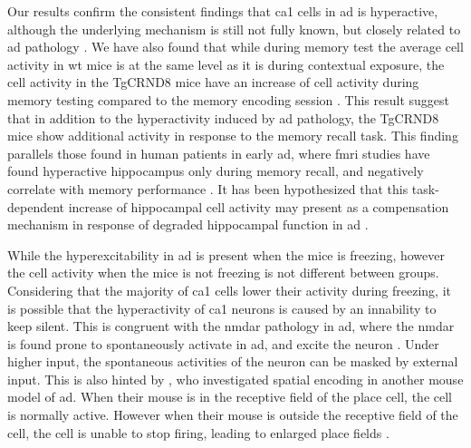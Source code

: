 Our results confirm the consistent findings that \gls{ca1} cells in \gls{ad} is hyperactive, although the underlying mechanism is still not fully known, but closely related to \gls{ad} pathology . We have also found that while during memory test the average cell activity in \gls{wt} mice is at the same level as it is during contextual exposure, the cell activity in the TgCRND8 mice have an increase of cell activity during memory testing compared to the memory encoding session . This result suggest that in addition to the hyperactivity induced by \gls{ad} pathology, the TgCRND8 mice show additional activity in response to the memory recall task. This finding parallels those found in human patients in early \gls{ad}, where \gls{fmri} studies have found hyperactive hippocampus only during memory recall, and negatively correlate with memory performance \citep{sperling09, reiman12, kunz15}. It has been hypothesized that this task-dependent increase of hippocampal cell activity may present as a compensation mechanism in response of degraded hippocampal function in \gls{ad} \citep{kunz15}.

While the hyperexcitability in \gls{ad} is present when the mice is freezing, however the cell activity when the mice is not freezing is not different between groups. Considering that the majority of \gls{ca1} cells lower their activity during freezing, it is possible that the hyperactivity of \gls{ca1} neurons is caused by an innability to keep silent. This is congruent with the \gls{nmdar} pathology in \gls{ad}, where the \gls{nmdar} is found prone to spontaneously activate in \gls{ad}, and excite the neuron . Under higher input, the spontaneous activities of the neuron can be masked by external input. This is also hinted by \citet{chang13}, who investigated spatial encoding in another mouse model of \gls{ad}. When their mouse is in the receptive field of the place cell, the cell is normally active. However when their mouse is outside the receptive field of the cell, the cell is unable to stop firing, leading to enlarged place fields \citep{chang13}. 

